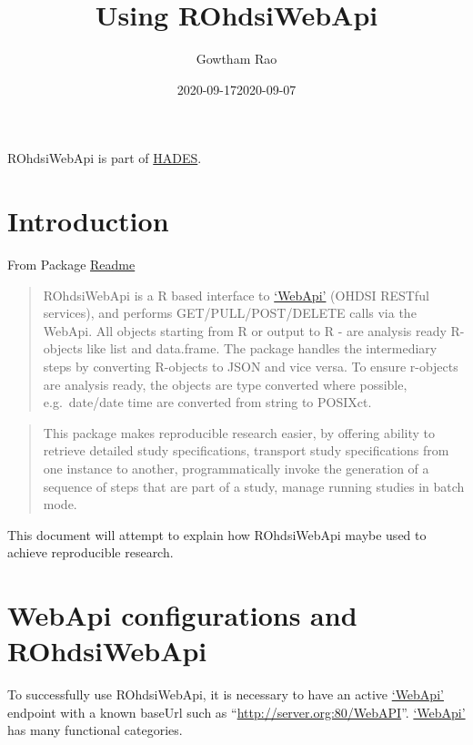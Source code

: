 \documentclass[
]{article}
\title{Using ROhdsiWebApi}
\author{Gowtham Rao}
\date{2020-09-17}
\date{2020-09-07}
\begin{document}
\maketitle

{
\setcounter{tocdepth}{2}
\tableofcontents
}
ROhdsiWebApi is part of \href{https://ohdsi.github.io/Hades}{HADES}.

\hypertarget{introduction}{%
\section{Introduction}\label{introduction}}

From Package
\href{https://github.com/OHDSI/ROhdsiWebApi/blob/master/README.md}{Readme}

\begin{quote}
ROhdsiWebApi is a R based interface to
\href{https://github.com/ohdsi/webapi}{`WebApi'} (OHDSI RESTful
services), and performs GET/PULL/POST/DELETE calls via the WebApi. All
objects starting from R or output to R - are analysis ready R-objects
like list and data.frame. The package handles the intermediary steps by
converting R-objects to JSON and vice versa. To ensure r-objects are
analysis ready, the objects are type converted where possible,
e.g.~date/date time are converted from string to POSIXct.
\end{quote}

\begin{quote}
This package makes reproducible research easier, by offering ability to
retrieve detailed study specifications, transport study specifications
from one instance to another, programmatically invoke the generation of
a sequence of steps that are part of a study, manage running studies in
batch mode.
\end{quote}

This document will attempt to explain how ROhdsiWebApi maybe used to
achieve reproducible research.

\hypertarget{webapi-configurations-and-rohdsiwebapi}{%
\section{WebApi configurations and
ROhdsiWebApi}\label{webapi-configurations-and-rohdsiwebapi}}

To successfully use ROhdsiWebApi, it is necessary to have an active
\href{https://github.com/ohdsi/webapi}{`WebApi'} endpoint with a known
baseUrl such as ``\url{http://server.org:80/WebAPI}''.
\href{https://github.com/ohdsi/webapi}{`WebApi'} has many functional
categories.
\end{document}
